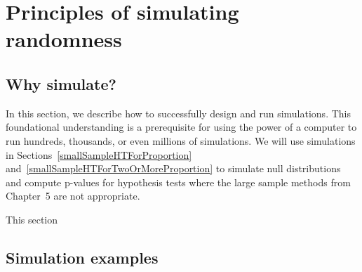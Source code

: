 \section{Principles of simulating randomness}
\label{simulateRandomness}

\subsection{Why simulate?}

In this section, we describe how to successfully design and run simulations. This foundational understanding is a prerequisite for using the power of a computer to run hundreds, thousands, or even millions of simulations. We will use simulations in Sections~\ref{smallSampleHTForProportion} and~\ref{smallSampleHTForTwoOrMoreProportion} to simulate null distributions and compute p-values for hypothesis tests where the large sample methods from Chapter~5 are not appropriate.

This section 


\subsection{Simulation examples}

